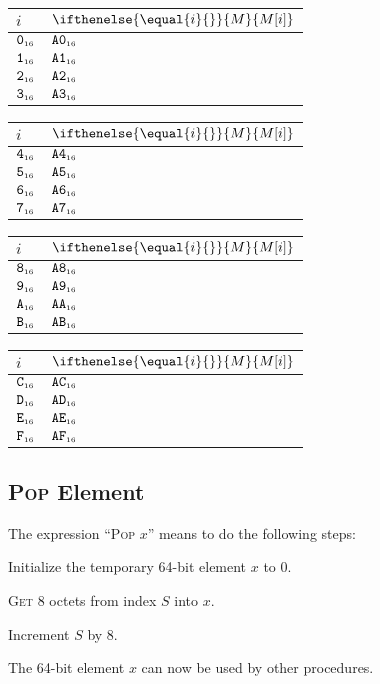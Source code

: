 \documentclass[a4paper,12pt]{article}
\makeatletter
\newcommand{\num}[1]{\texttt{#1}}
\newcommand{\hex}[1]{\num{#1}_{\textup{\tiny 16}}}
\newcommand{\MEM}[1]{\ifthenelse{\equal{#1}{}}{M}{M[#1]}}
\newcommand{\SP}{S}
\newcommand{\proc}[1]{\textsc{#1}}
\newenvironment{memtable}{%
  \begin{trivlist}
    \item
    }{%
    \end{trivlist}}
\newenvironment{memcolumn}{%
  \begin{tabular}{@{}ll@{}}
    $i$ & $\MEM{i}$ \\
    \hline}
    {%
    \hline
  \end{tabular}}
\newcommand{\memspace}{\qquad}
\makeatother
\begin{document}
\begin{memtable}
  \begin{memcolumn}
    $\hex{0}$ & $\hex{A0}$ \\
    $\hex{1}$ & $\hex{A1}$ \\
    $\hex{2}$ & $\hex{A2}$ \\
    $\hex{3}$ & $\hex{A3}$ \\
  \end{memcolumn}
  \memspace
  \begin{memcolumn}
    $\hex{4}$ & $\hex{A4}$ \\
    $\hex{5}$ & $\hex{A5}$ \\
    $\hex{6}$ & $\hex{A6}$ \\
    $\hex{7}$ & $\hex{A7}$ \\
  \end{memcolumn}
  \memspace
  \begin{memcolumn}
    $\hex{8}$ & $\hex{A8}$ \\
    $\hex{9}$ & $\hex{A9}$ \\
    $\hex{A}$ & $\hex{AA}$ \\
    $\hex{B}$ & $\hex{AB}$ \\
  \end{memcolumn}
  \memspace
  \begin{memcolumn}
    $\hex{C}$ & $\hex{AC}$ \\
    $\hex{D}$ & $\hex{AD}$ \\
    $\hex{E}$ & $\hex{AE}$ \\
    $\hex{F}$ & $\hex{AF}$ \\
  \end{memcolumn}
\end{memtable}

\subsection{\proc{Pop} Element}

The expression ``\proc{Pop} $x$'' means to do the following steps:
\begin{stepnumbers}
\item Initialize the temporary 64-bit element $x$ to 0.
\item \proc{Get} 8 octets from index $\SP$ into $x$.
\item Increment $\SP$ by 8.
\end{stepnumbers}
The 64-bit element $x$ can now be used by other procedures.
\end{document}
